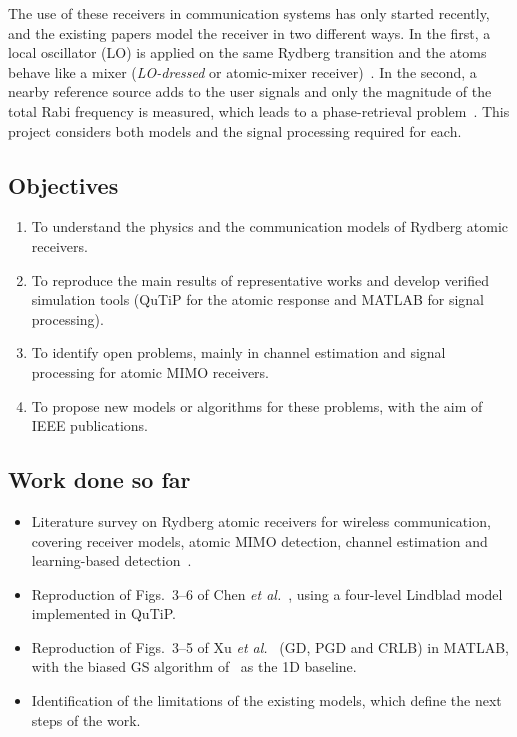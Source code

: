 \documentclass[11pt,a4paper]{article}
\begin{document}
The use of these receivers in communication systems has only started recently, and the
existing papers model the receiver in two different ways. In the first, a local oscillator
(LO) is applied on the same Rydberg transition and the atoms behave like a mixer
(\textit{LO-dressed} or atomic-mixer
receiver)~\cite{chen2025harnessing,jing2020,simons2019}. In the second, a nearby reference
source adds to the user signals and only the magnitude of the total Rabi frequency is
measured, which leads to a phase-retrieval problem~\cite{cui2025towards,xu2025channel}.
This project considers both models and the signal processing required for each.

\subsection{Objectives}

\begin{enumerate}[leftmargin=*,itemsep=2pt]
  \item To understand the physics and the communication models of Rydberg atomic receivers.
  \item To reproduce the main results of representative works and develop verified simulation
        tools (QuTiP for the atomic response and MATLAB for signal processing).
  \item To identify open problems, mainly in channel estimation and signal processing for
        atomic MIMO receivers.
  \item To propose new models or algorithms for these problems, with the aim of IEEE
        publications.
\end{enumerate}

\subsection{Work done so far}

\begin{itemize}[leftmargin=*,itemsep=2pt]
  \item Literature survey on Rydberg atomic receivers for wireless communication, covering
        receiver models, atomic MIMO detection, channel estimation and learning-based
        detection~\cite{cui2026rare,chen2025harnessing,cui2025towards,xu2025channel,liu2022deep}.
  \item Reproduction of Figs.~3--6 of Chen \textit{et al.}~\cite{chen2025harnessing}, using a four-level Lindblad model implemented in QuTiP.
  \item Reproduction of Figs.~3--5 of Xu \textit{et al.}~\cite{xu2025channel} (GD, PGD and
        CRLB) in MATLAB, with the biased GS algorithm of~\cite{cui2025towards} as the 1D baseline.
  \item Identification of the limitations of the existing models, which define the next steps
        of the work.
\end{itemize}
\end{document}
